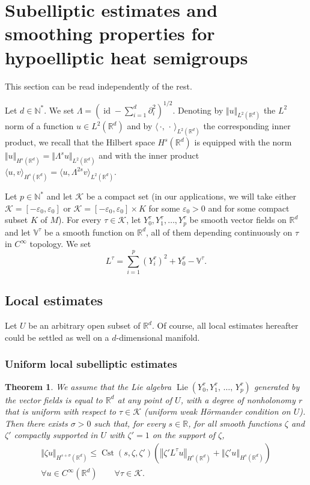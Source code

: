\documentclass[10pt]{amsart}
\newtheorem{theo}{Theorem}[section]
\theoremstyle{definition}\newtheorem{defi}[theo]{Definition}\newtheorem{rema}[theo]{Remark}\newtheorem{exam}[theo]{Example}\newtheorem{exem}[theo]{Example}\newtheorem{nota}[theo]{Notation}
\newcommand*\R{\mathbb{R}}
\newcommand*\N{\mathbb{N}}
\newcommand{\bbV}{\mathbb{V}}
\newcommand{\calK}{\mathcal{K}}
\DeclareMathOperator{\Cst}{Cst}
\DeclareMathOperator{\Lie}{Lie}
\DeclareMathOperator{\id}{id}
\renewcommand{\leq}{\leqslant}
\let\oldforall\forall
\renewcommand*{\forall}{\mathrel{\oldforall}}
\begin{document}
\section{Subelliptic estimates and smoothing properties for hypoelliptic heat semigroups}\label{sec:uniform_subelliptic_estimates}
This section can be read independently of the rest.

Let $d\in\N^*$. We set $\Lambda = (\id-\sum_{i=1}^d \partial_i^2)^{1/2}$. Denoting by $\Vert u\Vert_{L^2(\R^d)}$ the $L^2$ norm of a function $u\in L^2(\R^d)$ and by $\langle\,\cdot,\,\cdot\,\rangle_{L^2(\R^d)}$ the corresponding inner product, we recall that the Hilbert space $H^s(\R^d)$ is equipped with the norm $\Vert u\Vert_{H^s(\R^d)} = \Vert \Lambda^s u\Vert_{L^2(\R^d)}$ and with the inner product $\langle u,v\rangle_{H^s(\R^d)} = \langle u,\Lambda^{2s}v\rangle_{L^2(\R^d)}$.

Let $p\in\N^*$ and let $\calK$ be a compact set (in our applications, we will take either $\calK=[-\varepsilon_0,\varepsilon_0]$ or $\calK=[-\varepsilon_0,\varepsilon_0]\times K$ for some $\varepsilon_0>0$ and for some compact subset $K$ of $M$). For every $\tau\in\calK$, let $Y_0^\tau,Y_1^\tau,\ldots,Y_p^\tau$ be smooth vector fields on $\R^d$ and let $\bbV^\tau$ be a smooth function on $\R^d$, all of them depending continuously on $\tau$ in $C^\infty$ topology. We set
\begin{equation}\label{def_Ltau}
L^\tau = \sum_{i=1}^p \left(Y_i^\tau\right)^2 + Y_0^\tau - \bbV^\tau.
\end{equation}


\subsection{Local estimates}\label{sec:local_estimates}
Let $U$ be an arbitrary open subset of $\R^d$. Of course, all local estimates hereafter could be settled as well on a $d$-dimensional manifold.

\subsubsection{Uniform local subelliptic estimates}\label{sec:uniform_local_subelliptic_estimates}

\begin{theo}\label{thm_subelliptic_uniform}
We assume that the Lie algebra $\Lie(Y_0^\tau,Y_1^\tau,\,\ldots,\,Y_p^\tau)$ generated by the vector fields is equal to $\R^d$ at any point of $U$, with a degree of nonholonomy $r$ that is uniform with respect to $\tau\in\calK$ (\emph{uniform weak H\"ormander condition on $U$}). Then there exists $\sigma>0$ such that, for every $s\in\R$, for all smooth functions $\zeta$ and $\zeta'$ compactly supported in $U$ with $\zeta'=1$ on the support of $\zeta$,
\begin{multline*}
\Vert \zeta u\Vert_{H^{s+\sigma}(\R^d)} \leq \Cst\left(s,\zeta,\zeta'\right) \left(\left\Vert \zeta' L^\tau u\right\Vert_{H^s(\R^d)} + \left\Vert \zeta' u \right\Vert_{H^s\left(\R^d\right)} \right) \\
\forall u\in C^\infty\left(\R^d\right)\qquad \forall \tau\in\calK.
\end{multline*}
\end{theo}
\end{document}
